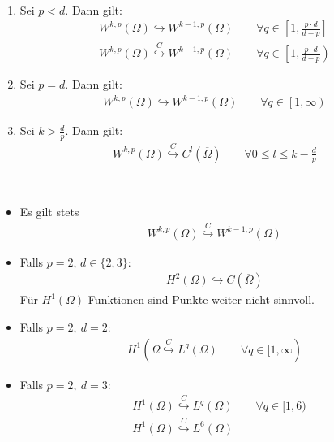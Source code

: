 \begin{satz}[Einbettung]\
\begin{enumerate}
\item Sei $p<d$. Dann gilt:
\begin{align*}
W^{k,p}(\Omega)\hookrightarrow W^{k-1,p}(\Omega)\qquad\forall q\in\left[1,\frac{p\cdot d}{d-p}\right]\\
W^{k,p}(\Omega)\stackrel{C}{\hookrightarrow} W^{k-1,p}(\Omega)\qquad\forall q\in\left[1,\frac{p\cdot d}{d-p}\right)
\end{align*}
\item Sei $p=d$. Dann gilt:
\begin{align*}
W^{k,p}(\Omega)\hookrightarrow W^{k-1,p}(\Omega)\qquad\forall q\in\left[1,\infty\right)
\end{align*}
\item Sei $k>\frac{d}{p}$. Dann gilt:
\begin{align*}
W^{k,p}(\Omega)\stackrel{C}{\hookrightarrow} C^l(\overline{\Omega})\qquad\forall 0\leq l\leq k-\frac{d}{p}
\end{align*}
\end{enumerate}
\end{satz}

\begin{bemerkung}\
\begin{itemize}
\item Es gilt stets
\begin{align*}
W^{k,p}(\Omega)\stackrel{C}{\hookrightarrow} W^{k-1,p}(\Omega)
\end{align*}
\item Falls $p=2$, $d\in\lbrace2,3\rbrace$: 
\begin{align*}
	H^2(\Omega)\hookrightarrow C(\overline{\Omega})
\end{align*}
Für $H^1(\Omega)$-Funktionen sind Punkte weiter nicht sinnvoll.
\item Falls $p=2,~d=2$: 
\begin{align*}
H^1(\Omega\stackrel{C}{\hookrightarrow} L^q(\Omega)\qquad\forall q\in[1,\infty)
\end{align*}
\item Falls $p=2,~d=3$: 
\begin{align*}
&H^1(\Omega)\stackrel{C}{\hookrightarrow} L^q(\Omega)\qquad\forall q\in[1,6)\\
&H^1(\Omega)\stackrel{C}{\hookrightarrow} L^6(\Omega)
\end{align*}
\end{itemize}
\end{bemerkung}

